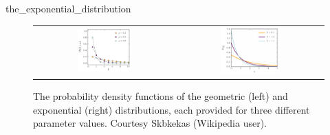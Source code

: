 \begin{detour}{the_exponential_distribution}
\begin{figure}[h]
\centering
\begin{tabular}{c @{\hskip3em} c}
\includegraphics[width = 0.4\textwidth, valign = b]{images/rearrangements/geometric_distribution} & \includegraphics[width = 0.42\textwidth, valign = b]{images/rearrangements/exponential_distribution}\\
\end{tabular}
\caption{The probability density functions of the geometric (left) and exponential (right) distributions, each provided for three different parameter values.  Courtesy Skbkekas (Wikipedia user).}
\label{fig:probability_density_functions}
\end{figure}

\end{detour}


